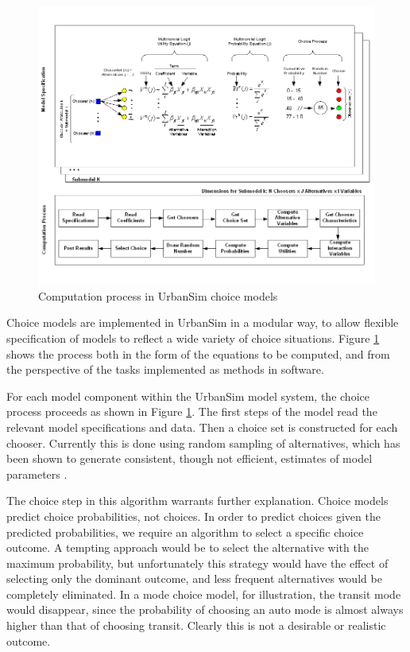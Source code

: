 \begin{figure}[htbp]
    \center
    \includegraphics[width=\textwidth]
    {graphics/ChoiceProcess.png}
    \caption{Computation process in UrbanSim choice models}
    \label{fig:choiceprocess}
\end{figure}

Choice models are implemented in UrbanSim in a modular way, to allow flexible specification of models to reflect a wide variety of choice situations. Figure \ref{fig:choiceprocess} shows the process both in the form of the equations to be computed, and from the perspective of the tasks implemented as methods in software.

For each model component within the UrbanSim model system, the choice process proceeds as shown in Figure \ref{fig:choiceprocess}. The first steps of the model read the relevant model specifications and data. Then a choice set is constructed for each chooser. Currently this is done using random sampling of alternatives, which has been shown to generate consistent, though not efficient, estimates of model parameters \citep{ben-akiva-lerman-1987}.

The choice step in this algorithm warrants further explanation. Choice models predict choice probabilities, not choices. In order to predict choices given the predicted probabilities, we require an algorithm to select a specific choice outcome. A tempting approach would be to select the alternative with the maximum probability, but unfortunately this strategy would have the effect of selecting only the dominant outcome, and less frequent alternatives would be completely eliminated. In a mode choice model, for illustration, the transit mode would disappear, since the probability of choosing an auto mode is almost always higher than that of choosing transit. Clearly this is not a desirable or realistic outcome.

